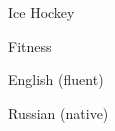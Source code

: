 \vspace{5mm}
\begin{cvskills}{0}{0}
            {\faSkating}      %
            {
                \begin{cvitems}
                    \item {Ice Hockey}
                    \item {Fitness}
                \end{cvitems}
            }
            {\faLanguage}      %
            {
                \begin{cvitems}
                    \item {English (fluent)}
                    \item {Russian (native)}
                \end{cvitems}
            }
\end{cvskills}
